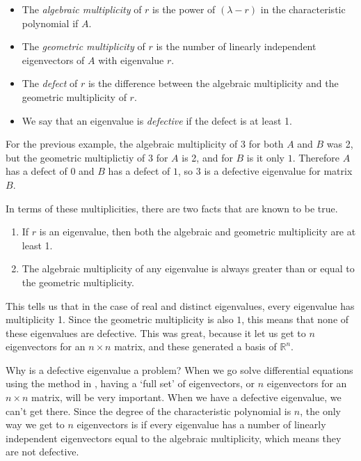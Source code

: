\begin{definition}
\begin{itemize}
\item The \emph{algebraic multiplicity} of $r$ is the power of $(\lambda - r)$ in the characteristic polynomial if $A$.
\item The \emph{geometric multiplicity} of $r$ is the number of linearly independent eigenvectors of $A$ with eigenvalue  $r$.
\item The \emph{defect} of $r$ is the difference between the algebraic multiplicity and the geometric multiplicity of $r$. 
\item We say that an eigenvalue is \emph{defective} if the defect is at least 1. 
\end{itemize}
\end{definition}

For the previous example, the algebraic multiplicity of $3$ for both $A$ and $B$ was 2, but the geometric multiplictiy of $3$ for $A$ is 2, and for $B$ is it only $1$. Therefore $A$ has a defect of $0$ and $B$ has a defect of $1$, so $3$ is a defective eigenvalue for matrix $B$.

In terms of these multiplicities, there are two facts that are known to be true.
\begin{enumerate}
\item If $r$ is an eigenvalue, then both the algebraic and geometric multiplicity are at least 1.
\item The algebraic multiplicity of any eigenvalue is always greater than or equal to the geometric multiplicity.
\end{enumerate}

This tells us that in the case of real and distinct eigenvalues, every eigenvalue has multiplicity 1. Since the geometric multiplicity is also $1$, this means that none of these eigenvalues are defective. This was great, because it let us get to $n$ eigenvectors for an $n \times n$ matrix, and these generated a basis of $\mathbb{R}^n$. 

Why is a defective eigenvalue a problem? When we go solve differential equations using the method in , having a `full set' of eigenvectors, or $n$ eigenvectors for an $n \times n$ matrix, will be very important. When we have a defective eigenvalue, we can't get there. Since the degree of the characteristic polynomial is $n$, the only way we get to $n$ eigenvectors is if every eigenvalue has a number of linearly independent eigenvectors equal to the algebraic multiplicity, which means they are not defective. 

